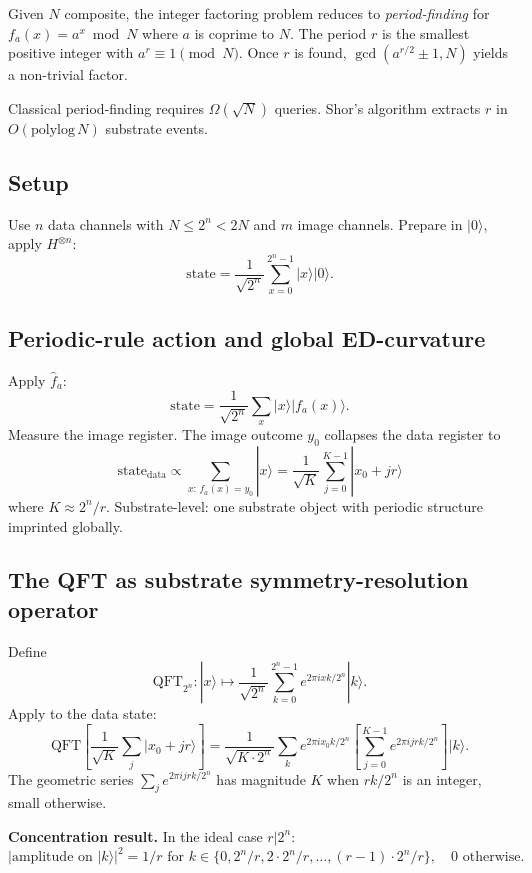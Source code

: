 \documentclass[11pt,a4paper]{article}
\begin{document}
Given $N$ composite, the integer factoring problem reduces to \emph{period-finding} for $f_a(x) = a^x \bmod N$ where $a$ is coprime to $N$. The period $r$ is the smallest positive integer with $a^r \equiv 1 \pmod N$. Once $r$ is found, $\gcd(a^{r/2} \pm 1, N)$ yields a non-trivial factor.

Classical period-finding requires $\Omega(\sqrt N)$ queries. Shor's algorithm extracts $r$ in $O(\mathrm{polylog}\, N)$ substrate events.

\subsection{Setup}

Use $n$ data channels with $N \leq 2^n < 2N$ and $m$ image channels. Prepare in $|0\rangle$, apply $H^{\otimes n}$:
\[
\text{state} = \frac{1}{\sqrt{2^n}}\sum_{x=0}^{2^n-1}|x\rangle|0\rangle.
\]

\subsection{Periodic-rule action and global ED-curvature}

Apply $\hat f_a$:
\[
\text{state} = \frac{1}{\sqrt{2^n}}\sum_x |x\rangle|f_a(x)\rangle.
\]
Measure the image register. The image outcome $y_0$ collapses the data register to
\[
\text{state}_{\mathrm{data}} \propto \sum_{x:\, f_a(x) = y_0}|x\rangle = \frac{1}{\sqrt K}\sum_{j=0}^{K-1}|x_0 + jr\rangle
\]
where $K \approx 2^n/r$. Substrate-level: one substrate object with periodic structure imprinted globally.

\subsection{The QFT as substrate symmetry-resolution operator}

Define
\[
\mathrm{QFT}_{2^n}: |x\rangle \mapsto \frac{1}{\sqrt{2^n}}\sum_{k=0}^{2^n-1} e^{2\pi i xk/2^n}|k\rangle.
\]
Apply to the data state:
\[
\mathrm{QFT}\left[\frac{1}{\sqrt K}\sum_j |x_0 + jr\rangle\right] = \frac{1}{\sqrt{K\cdot 2^n}}\sum_k e^{2\pi i x_0 k/2^n}\left[\sum_{j=0}^{K-1} e^{2\pi i jrk/2^n}\right]|k\rangle.
\]
The geometric series $\sum_j e^{2\pi i jrk/2^n}$ has magnitude $K$ when $rk/2^n$ is an integer, small otherwise.

\textbf{Concentration result.} In the ideal case $r | 2^n$:
\[
|\text{amplitude on }|k\rangle|^2 = 1/r \text{ for } k \in \{0, 2^n/r, 2\cdot 2^n/r, \ldots, (r-1)\cdot 2^n/r\}, \quad 0 \text{ otherwise}.
\]
\end{document}
